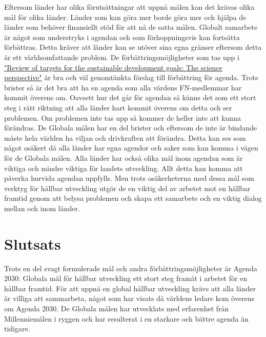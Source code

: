 \documentclass{report}
\begin{document}
Eftersom länder har olika förutsättningar att uppnå målen kan det krävas olika mål för olika länder. Länder som kan göra mer borde göra mer och hjälpa de länder som behöver finansiellt stöd för att nå de satta målen. Globalt samarbete är något som understryks i agendan och som förhoppningsvis kan fortsätta förbättras. Detta kräver att länder kan se utöver sina egna gränser eftersom detta är ett världsomfattande problem.
De förbättringsmöjligheter som tas upp i \href{http://www.icsu.org/publications/reports-and-reviews/review-of-targets-for-the-sustainable-development-goals-the-science-perspective-2015/SDG-Report.pdf}{"Review of targets for the sustainable development goals: The science perspective"} är bra och väl genomtänkta förslag till förbättring för agenda. Trots brister så är det bra att ha en agenda som alla värdens FN-medlemmar har kommit överens om. Oavsett hur det går för agendan så känns det som ett stort steg i rätt riktning att alla länder hart kommit överens om detta och ser problemen. Om problemen inte tas upp så kommer de heller inte att kunna förändras. De Globala målen har en del brister och eftersom de inte är bindande måste hela världen ha viljan och drivkraften att förändra. Detta kan ses som något osäkert då alla länder har egna agendor och saker som kan komma i vägen för de Globala målen. Alla länder har också olika mål inom agendan som är viktiga och mindre viktiga för landets utveckling. Allt detta kan komma att påverka hurvida agendan uppfylls. Men trots osäkerheterna med dessa mål som verktyg för hållbar utveckling utgör de en viktig del av arbetet mot en hållbar framtid genom att belysa problemen och skapa ett samarbete och en viktig dialog mellan och inom länder. \\



\newpage
\section{Slutsats}
Trots en del svagt formulerade mål och andra förbättringsmöjligheter är Agenda 2030: Globala mål för hållbar utveckling ett stort steg framåt i arbetet för en hållbar framtid. För att uppnå en global hållbar utveckling krävs att alla länder är villiga att sammarbeta, något som har visats då världens ledare kom överens om Agenda 2030. De Globala målen har utvecklats med erfarenhet från Millenniemålen i ryggen och har resulterat i en starkare och bättre agenda än tidigare.


 
\end{document}
